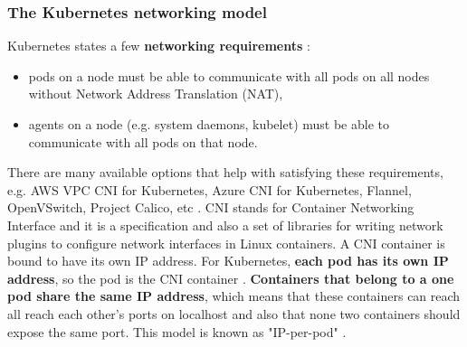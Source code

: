 \subsubsection{The Kubernetes networking model}
\label{k8s-net}
Kubernetes states a few \textbf{networking requirements} \cite{k8s-net}:
\begin{itemize}
\item pods on a node must be able to communicate with all pods on all nodes without Network Address Translation (NAT),
\item agents on a node (e.g. system daemons, kubelet) must be able to communicate with all pods on that node.
\end{itemize}

There are many available options that help with satisfying these requirements, e.g. AWS VPC CNI for Kubernetes, Azure CNI for Kubernetes, Flannel, OpenVSwitch, Project Calico, etc \cite{k8s-net}. CNI stands for Container Networking Interface and it is a specification and also a set of libraries for writing network plugins to configure network interfaces in Linux containers. A CNI container is bound to have its own IP address. For Kubernetes, \textbf{each pod has its own IP address}, so the pod is the CNI container \cite{book-mastering-k8s}. \textbf{Containers that belong to a one pod share the same IP address}, which means that these containers can reach all reach each other’s ports on localhost and also that none two containers should expose the same port. This model is known as "IP-per-pod" \cite{k8s-net}.
